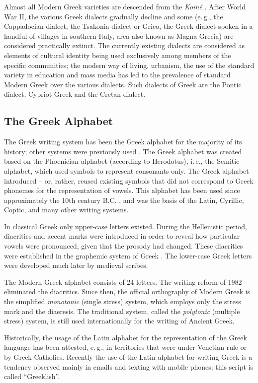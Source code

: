 \documentclass[]{../../metanetpaper}
\begin{document}
\begin{multicols}{2}
Almost all Modern Greek varieties are descended from the \textit{Koiné} \cite{Bro1}. After World War II, the various Greek dialects gradually decline and some (e.\,g., the Cappadocian dialect, the Tsakonia dialect or Grico, the Greek dialect spoken in a handful of villages in southern Italy, area also known as Magna Grecia) are considered practically extinct. The currently existing dialects are considered as elements of cultural identity being used exclusively among members of the specific communities; the modern way of living, urbanism, the use of the standard variety in education and mass media has led to the prevalence of standard Modern Greek over the various dialects. Such dialects of Greek are the Pontic dialect, Cypriot Greek and the Cretan dialect.

\subsection{The Greek Alphabet}

The Greek writing system has been the Greek alphabet for the majority of its history; other systems were previously used \cite{Kopi1}. The Greek alphabet was created based on the Phoenician alphabet (according to Herodotus), i.\,e., the Semitic alphabet, which used symbols to represent consonants only. The Greek alphabet introduced – or, rather, reused existing symbols that did not correspond to Greek phonemes for the representation of vowels. This alphabet has been used since approximately the 10th century B.C. \cite{Tonn1}, and was the basis of the Latin, Cyrillic, Coptic, and many other writing systems.

In classical Greek only upper-case letters existed. During the Hellenistic period, diacritics and accent marks were introduced in order to reveal how particular vowels were pronounced, given that the prosody had changed. These diacritics were established in the graphemic system of Greek \cite{Chris1}. The lower-case Greek letters were developed much later by medieval scribes.

The Modern Greek alphabet consists of 24 letters. The writing reform of 1982 eliminated the diacritics. Since then, the official orthography of Modern Greek is the simplified \textit{monotonic} (single stress) system, which employs only the stress mark and the diaeresis. The traditional system, called the \textit{polytonic} (multiple stress) system, is still used internationally for the writing of Ancient Greek.

Historically, the usage of the Latin alphabet for the representation of the Greek language has been attested, e.\,g., in territories that were under Venetian rule or by Greek Catholics. Recently the use of the Latin alphabet for writing Greek is a tendency observed mainly in emails and texting with mobile phones; this script is called “Greeklish”.


\end{multicols}
\end{document}
